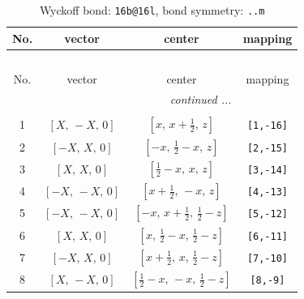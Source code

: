 \documentclass[fleqn,8pt]{jsarticle}
\begin{document}
\begin{longtable}{cccc}
\caption{Wyckoff bond: {\tt 16b@16l}, bond symmetry: {\tt ..m}}
 \\
 \hline \hline
No. & vector & center & mapping \\ \hline \endfirsthead

\multicolumn{3}{l}{\tablename\ \thetable{}} \\
 \hline \hline
No. & vector & center & mapping \\ \hline \endhead

 \hline \hline
\multicolumn{3}{r}{\footnotesize\it continued ...} \\ \endfoot

 \hline \hline
\multicolumn{3}{r}{} \\ \endlastfoot

1 & $\left[ X,\, - X,\, 0 \right]$ & $\left[ x,\, x + \frac{1}{2},\, z \right]$ & {\tt [1,-16]} \\ \hline
2 & $\left[ - X,\, X,\, 0 \right]$ & $\left[ - x,\, \frac{1}{2} - x,\, z \right]$ & {\tt [2,-15]} \\ \hline
3 & $\left[ X,\, X,\, 0 \right]$ & $\left[ \frac{1}{2} - x,\, x,\, z \right]$ & {\tt [3,-14]} \\ \hline
4 & $\left[ - X,\, - X,\, 0 \right]$ & $\left[ x + \frac{1}{2},\, - x,\, z \right]$ & {\tt [4,-13]} \\ \hline
5 & $\left[ - X,\, - X,\, 0 \right]$ & $\left[ - x,\, x + \frac{1}{2},\, \frac{1}{2} - z \right]$ & {\tt [5,-12]} \\ \hline
6 & $\left[ X,\, X,\, 0 \right]$ & $\left[ x,\, \frac{1}{2} - x,\, \frac{1}{2} - z \right]$ & {\tt [6,-11]} \\ \hline
7 & $\left[ - X,\, X,\, 0 \right]$ & $\left[ x + \frac{1}{2},\, x,\, \frac{1}{2} - z \right]$ & {\tt [7,-10]} \\ \hline
8 & $\left[ X,\, - X,\, 0 \right]$ & $\left[ \frac{1}{2} - x,\, - x,\, \frac{1}{2} - z \right]$ & {\tt [8,-9]} \\
\end{longtable}
\renewcommand{\arraystretch}{1.2}
\end{document}
